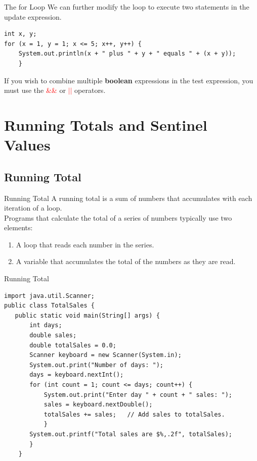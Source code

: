\documentclass[11pt]{beamer}
\newcommand{\red}[1]{\textcolor{red}{#1}}
\begin{document}
\begin{frame}[fragile]{The for Loop}
    We can further modify the loop to execute two statements in the update expression.
    \begin{lstlisting}
int x, y;
for (x = 1, y = 1; x <= 5; x++, y++) {
    System.out.println(x + " plus " + y + " equals " + (x + y));
    }
    \end{lstlisting}
If you wish to combine multiple \textbf{boolean} expressions in the test expression, you must use the \red{\&\&} or \red{$\vert \vert$} operators.
\end{frame}

\section{Running Totals and Sentinel Values}
\subsection{Running Total}
\begin{frame}{Running Total}
    A running total is a sum of numbers that accumulates with each iteration of a loop. \\ 
    \vspace{1em}
    Programs that calculate the total of a series of numbers typically use two elements:
    \begin{enumerate}
        \item A loop that reads each number in the series.
        \item A variable that accumulates the total of the numbers as they are read.
    \end{enumerate}
\end{frame}

\begin{frame}[fragile]{Running Total}
    \begin{lstlisting}[basicstyle=\ttfamily\scriptsize]
import java.util.Scanner;
public class TotalSales {
   public static void main(String[] args) {
	   int days;
	   double sales;
	   double totalSales = 0.0;
	   Scanner keyboard = new Scanner(System.in);
	   System.out.print("Number of days: ");
	   days = keyboard.nextInt();
	   for (int count = 1; count <= days; count++) {
		   System.out.print("Enter day " + count + " sales: ");
		   sales = keyboard.nextDouble();
		   totalSales += sales;   // Add sales to totalSales. 
		   }
	   System.out.printf("Total sales are $%,.2f", totalSales);
	   }
    }
    \end{lstlisting}
\end{frame}
\end{document}
